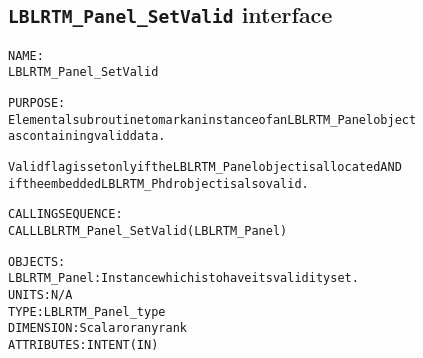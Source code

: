 \subsection{\texttt{LBLRTM\_Panel\_SetValid} interface}
  \label{sec:LBLRTM_Panel_SetValid_interface}
  \begin{alltt}
 
  NAME:
        LBLRTM_Panel_SetValid
 
  PURPOSE:
        Elemental subroutine to mark an instance of an LBLRTM_Panel object
        as containing valid data.
 
        Valid flag is set only if the LBLRTM_Panel object is allocated AND
        if the embedded LBLRTM_Phdr object is also valid.
 
  CALLING SEQUENCE:
        CALL LBLRTM_Panel_SetValid( LBLRTM_Panel )
 
  OBJECTS:
        LBLRTM_Panel:  Instance which is to have its validity set.
                       UNITS:      N/A
                       TYPE:       LBLRTM_Panel_type
                       DIMENSION:  Scalar or any rank
                       ATTRIBUTES: INTENT(IN)
 
  \end{alltt}
